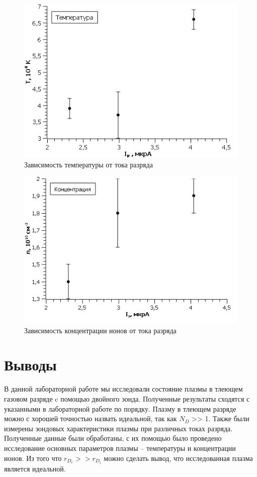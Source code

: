 \begin{figure}[h!]
    \centering
    \includegraphics[scale=1.4]{T.png}
    \caption{Зависимость температуры от тока разряда}
    \label{fig:ref_to_this_foto}
\end{figure}

\begin{figure}[h!]
    \centering
    \includegraphics[scale=1.4]{n.png}
    \caption{Зависимость концентрации ионов от тока разряда}
    \label{fig:ref_to_this_foto}
\end{figure}
\newpage
\section{Выводы}
\par В данной лабораторной работе мы исследовали состояние плазмы в тлеющем газовом
разряде c помощью двойного зонда. Полученные результаты сходятся с указанными в
лабораторной работе по порядку. Плазму в тлеющем разряде можно с хорошей точностью
назвать идеальной, так как $N_D$ >> 1. Также были измерены зондовых характеристики плазмы при различных токах разряда. Полученные данные были обработаны, с их помощью было проведено исследование основных параметров плазмы –
температуры и концентрации ионов. Из того что $r_{D_e} >> r_{D_i}$ можно сделать вывод, что исследованная плазма является идеальной.


